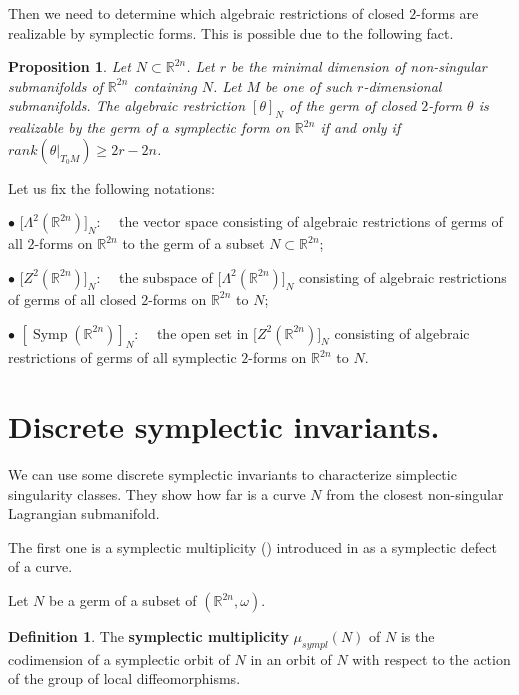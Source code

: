 \documentclass{amsart}
\newtheorem{prop}[thm]{Proposition}
\theoremstyle{definition}
\newtheorem{defn}[thm]{Definition}
\numberwithin{equation}{section}
\begin{document}
Then we need to determine which algebraic restrictions of closed
$2$-forms are realizable by symplectic forms. This is possible due
to the following fact.

\begin{prop}\label{rank}
 Let $N\subset \mathbb R^{2n}$. Let $r$ be
the minimal dimension of non-singular submanifolds of $\mathbb
R^{2n}$ containing $N$. Let $M$ be one of such $r$-dimensional
submanifolds. The algebraic restriction $[\theta ]_N$ of the germ
of closed $2$-form $\theta $ is realizable by the germ of a
symplectic form on $\mathbb R^{2n}$ if and only if $rank (\theta
\vert _{T_0M})\ge 2r - 2n$.
\end{prop}

Let us fix the following notations:

\smallskip

\noindent $\bullet$  ${\bigl [\Lambda ^2(\mathbb R^{2n})\bigr ]_N} $: \ \ the vector space
consisting of algebraic restrictions of germs of all $2$-forms on
$\mathbb R^{2n}$ to the germ of a subset $N\subset \mathbb
R^{2n}$;

\smallskip

\noindent $\bullet$  ${\bigl [Z^2(\mathbb R^{2n})\bigr ]_N}$: \ \ the subspace of
${\bigl [\Lambda ^2(\mathbb R^{2n})\bigr ]_N} $ consisting of algebraic restrictions of germs of
all closed $2$-forms on $\mathbb R^{2n}$ to $N$;

\smallskip

\noindent $\bullet$ ${\left [\operatorname{Symp} (\mathbb R^{2n})\right ]_{N}} $: \ \ the open set in
${\bigl [Z^2(\mathbb R^{2n})\bigr ]_N}$ consisting of algebraic restrictions of germs of
all symplectic $2$-forms on $\mathbb R^{2n}$ to $N$.

\medskip

\section{Discrete symplectic invariants.}\label{discrete}

We can use some discrete symplectic invariants to characterize simplectic singularity classes. They show how far is a curve $N$ from the closest non-singular Lagrangian submanifold.

 The first one is a symplectic
multiplicity (\cite{DJZ2}) introduced  in \cite{IJ1} as a
symplectic defect of a curve.

Let $N$ be a germ of a subset of $(\mathbb R^{2n},\omega)$.

\begin{defn}
\label{def-mu}
 The {\bf symplectic multiplicity} $\mu_{sympl}(N)$ of  $N$ is the codimension of
 a symplectic orbit of $N$ in an orbit of $N$ with respect to the action of the group of local diffeomorphisms.
\end{defn}
\end{document}
